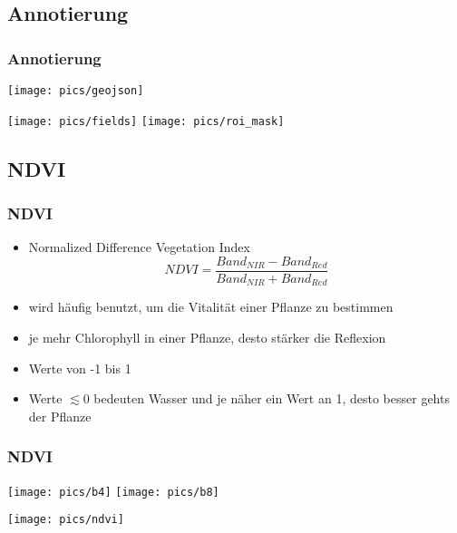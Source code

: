 \documentclass{beamer}
\begin{document}

\begin{frame}\section{Annotierung}\frametitle{Annotierung}
\begin{minipage}{0.5\textwidth}
	\texttt{[image: pics/geojson]}
\end{minipage}
\hspace{1em}
\begin{minipage}{0.4\textwidth}
	\texttt{[image: pics/fields]}
	\texttt{[image: pics/roi\_mask]}
\end{minipage}
\end{frame}


\begin{frame}\section{NDVI}\frametitle{NDVI}
	\begin{itemize}
		\item Normalized Difference Vegetation Index
		\begin{equation*}
			NDVI = \frac{Band_{NIR} - Band_{Red}} {Band_{NIR} + Band_{Red}}
		\end{equation*}
		\item wird häufig benutzt, um die Vitalität einer Pflanze zu bestimmen
		\item je mehr Chlorophyll in einer Pflanze, desto stärker die Reflexion
		\item Werte von -1 bis 1
		\item Werte $\lesssim 0$ bedeuten Wasser und je näher ein Wert an 1, desto besser gehts der Pflanze
	\end{itemize}
\end{frame}

\begin{frame}\frametitle{NDVI}
\begin{minipage}{0.4\textwidth}
	\texttt{[image: pics/b4]}
	\texttt{[image: pics/b8]}
\end{minipage}
\hspace{2em}
\begin{minipage}{0.4\textwidth}
	\texttt{[image: pics/ndvi]}
\end{minipage}
\end{frame}
\end{document}
